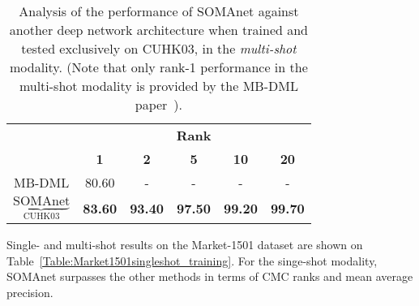 \documentclass[10pt,journal,letterpaper,compsoc]{IEEEtran}
\newcommand{\ts}[2]{$\underbrace{\text{#1}}_\text{#2}$}
\begin{document}
\begin{table}[htbp]
\scriptsize
	\centering
	\caption{Analysis of the performance of SOMAnet against another deep network architecture when trained and tested exclusively on CUHK03, in the \emph{multi-shot} modality. (Note that only rank-1 performance in the multi-shot modality is provided by the MB-DML paper~\cite{mbdml}).}
	\begin{tabular}{cccccc}
		\toprule
		\multirow{ 2}{*}{\textbf{}} & \multicolumn{5}{c}{\textbf{Rank}} \\
		\cmidrule(r){2-6}
		 & \textbf{1} & \textbf{2}& \textbf{5} & \textbf{10} & \textbf{20} \\
		\midrule
        MB-DML \cite{mbdml} & 80.60   & -   & -   & -   & -       \\
        \ts{SOMAnet}{CUHK03}    & \textbf{83.60}   & \textbf{93.40}   & \textbf{97.50}   & \textbf{99.20}   & \textbf{99.70}   \\
    \bottomrule
    \end{tabular} \label{Table:CUHK03multishot_training}
\end{table}



Single- and multi-shot results on the Market-1501 dataset are shown on Table~\ref{Table:Market1501singleshot_training}. For the singe-shot modality, SOMAnet surpasses the other methods in terms of CMC ranks and mean average precision.
\end{document}
